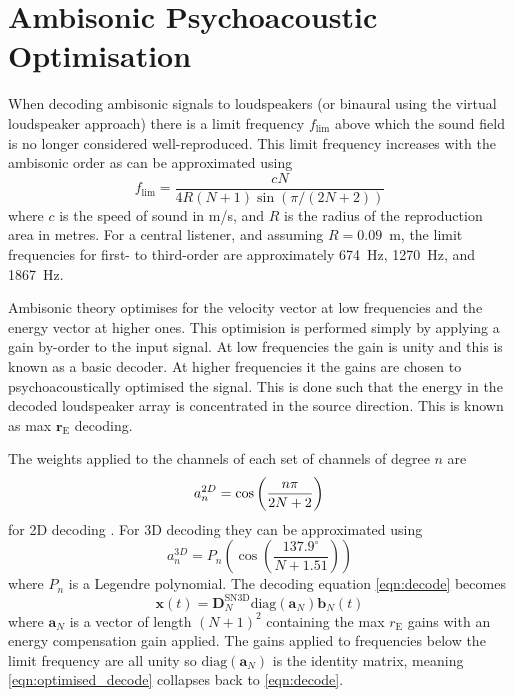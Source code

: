 \documentclass[12pt]{report}
\begin{document}
\section{Ambisonic Psychoacoustic Optimisation}\label{AmbiShelves}

When decoding ambisonic signals to loudspeakers (or binaural using the virtual loudspeaker approach) there is a limit frequency $f_{\mathrm{lim}}$ above which the sound field is no longer considered well-reproduced.
This limit frequency increases with the ambisonic order as can be approximated using \cite{Bertet2013}
\begin{equation}
    f_{\mathrm{lim}} = \frac{c N}{4 R (N + 1) \sin(\pi/(2N + 2))}
\end{equation}
where $c$ is the speed of sound in m/s, and $R$ is the radius of the reproduction area in metres.
For a central listener, and assuming $R = 0.09$~m, the limit frequencies for first- to third-order are approximately 674~Hz, 1270~Hz, and 1867~Hz.

Ambisonic theory optimises for the velocity vector at low frequencies and the energy vector at higher ones.
This optimision is performed simply by applying a gain by-order to the input signal.
At low frequencies the gain is unity and this is known as a basic decoder.
At higher frequencies it the gains are chosen to psychoacoustically optimised the signal.
This is done such that the energy in the decoded loudspeaker array is concentrated in the source direction.
This is known as max $\textbf{r}_{\textrm{E}}$ decoding.

The weights applied to the channels of each set of channels of degree $n$ are
\begin{equation}
a_{n}^{2D} = \cos\left( \frac{n\pi}{2N + 2} \right)\\
\end{equation}
for 2D decoding \cite{Daniel2000}.
For 3D decoding they can be approximated using \cite{Zotter2012a}
\begin{equation}
    a_{n}^{3D} = P_{n}\left(\cos \left(\frac{137.9^{\circ}}{N + 1.51}\right) \right)
\end{equation}
where $P_{n}$ is a Legendre polynomial.
The decoding equation \cref{eqn:decode} becomes
\begin{equation}\label{eqn:optimised_decode}
\textbf{x}(t) = \textbf{D}_{N}^{\mathrm{SN3D}} \mathrm{diag}(\textbf{a}_N)\textbf{b}_{N}(t)
\end{equation}
where $\textbf{a}_N$ is a vector of length $(N + 1)^{2}$ containing the max $r_{\mathrm{E}}$ gains with an energy compensation gain applied.
The gains applied to frequencies below the limit frequency are all unity so $\mathrm{diag}(\textbf{a}_N)$ is the identity matrix, meaning \cref{eqn:optimised_decode} collapses back to \cref{eqn:decode}.
\end{document}
